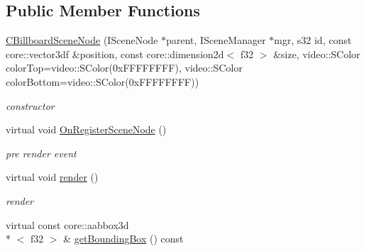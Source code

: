 \subsection*{Public Member Functions}
\begin{DoxyCompactItemize}
\item 
\hypertarget{classirr_1_1scene_1_1_c_billboard_scene_node_ab5cfd639e14bc3d6c5a6359bc40d29b8}{\hyperlink{classirr_1_1scene_1_1_c_billboard_scene_node_ab5cfd639e14bc3d6c5a6359bc40d29b8}{C\-Billboard\-Scene\-Node} (I\-Scene\-Node $\ast$parent, I\-Scene\-Manager $\ast$mgr, s32 id, const core\-::vector3df \&position, const core\-::dimension2d$<$ f32 $>$ \&size, video\-::\-S\-Color color\-Top=video\-::\-S\-Color(0x\-F\-F\-F\-F\-F\-F\-F\-F), video\-::\-S\-Color color\-Bottom=video\-::\-S\-Color(0x\-F\-F\-F\-F\-F\-F\-F\-F))}\label{classirr_1_1scene_1_1_c_billboard_scene_node_ab5cfd639e14bc3d6c5a6359bc40d29b8}

\begin{DoxyCompactList}\small\item\em constructor \end{DoxyCompactList}\item 
\hypertarget{classirr_1_1scene_1_1_c_billboard_scene_node_aa34c78f050aa93825f77138211dda4b2}{virtual void \hyperlink{classirr_1_1scene_1_1_c_billboard_scene_node_aa34c78f050aa93825f77138211dda4b2}{On\-Register\-Scene\-Node} ()}\label{classirr_1_1scene_1_1_c_billboard_scene_node_aa34c78f050aa93825f77138211dda4b2}

\begin{DoxyCompactList}\small\item\em pre render event \end{DoxyCompactList}\item 
\hypertarget{classirr_1_1scene_1_1_c_billboard_scene_node_a618822c3659046b8d2f2d177a3bf374c}{virtual void \hyperlink{classirr_1_1scene_1_1_c_billboard_scene_node_a618822c3659046b8d2f2d177a3bf374c}{render} ()}\label{classirr_1_1scene_1_1_c_billboard_scene_node_a618822c3659046b8d2f2d177a3bf374c}

\begin{DoxyCompactList}\small\item\em render \end{DoxyCompactList}\item 
\hypertarget{classirr_1_1scene_1_1_c_billboard_scene_node_abd10ab8bf1f7573aa013b8b9023c39ac}{virtual const core\-::aabbox3d\\*
$<$ f32 $>$ \& \hyperlink{classirr_1_1scene_1_1_c_billboard_scene_node_abd10ab8bf1f7573aa013b8b9023c39ac}{get\-Bounding\-Box} () const }\label{classirr_1_1scene_1_1_c_billboard_scene_node_abd10ab8bf1f7573aa013b8b9023c39ac}


\end{DoxyCompactItemize}

